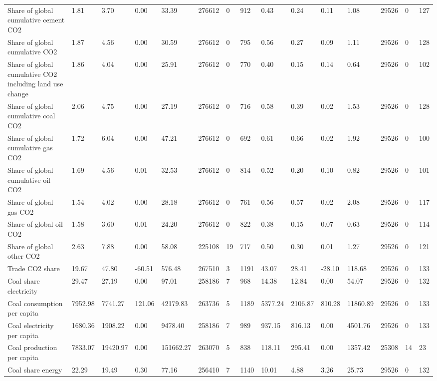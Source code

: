 \begin{longtable}{lllllllllllllll}
\addlinespace
Share of global cumulative cement CO2 & 1.81 & 3.70 & 0.00 & 33.39 & 276612 & 0 & 912 & 0.43 & 0.24 & 0.11 & 1.08 & 29526 & 0 & 127\\
Share of global cumulative CO2 & 1.87 & 4.56 & 0.00 & 30.59 & 276612 & 0 & 795 & 0.56 & 0.27 & 0.09 & 1.11 & 29526 & 0 & 128\\
Share of global cumulative CO2 including land use change & 1.86 & 4.04 & 0.00 & 25.91 & 276612 & 0 & 770 & 0.40 & 0.15 & 0.14 & 0.64 & 29526 & 0 & 102\\
Share of global cumulative coal CO2 & 2.06 & 4.75 & 0.00 & 27.19 & 276612 & 0 & 716 & 0.58 & 0.39 & 0.02 & 1.53 & 29526 & 0 & 128\\
Share of global cumulative gas CO2 & 1.72 & 6.04 & 0.00 & 47.21 & 276612 & 0 & 692 & 0.61 & 0.66 & 0.02 & 1.92 & 29526 & 0 & 100\\
\addlinespace
Share of global cumulative oil CO2 & 1.69 & 4.56 & 0.01 & 32.53 & 276612 & 0 & 814 & 0.52 & 0.20 & 0.10 & 0.82 & 29526 & 0 & 101\\
Share of global gas CO2 & 1.54 & 4.02 & 0.00 & 28.18 & 276612 & 0 & 761 & 0.56 & 0.57 & 0.02 & 2.08 & 29526 & 0 & 117\\
Share of global oil CO2 & 1.58 & 3.60 & 0.01 & 24.20 & 276612 & 0 & 822 & 0.38 & 0.15 & 0.07 & 0.63 & 29526 & 0 & 114\\
Share of global other CO2 & 2.63 & 7.88 & 0.00 & 58.08 & 225108 & 19 & 717 & 0.50 & 0.30 & 0.01 & 1.27 & 29526 & 0 & 121\\
Trade CO2 share & 19.67 & 47.80 & -60.51 & 576.48 & 267510 & 3 & 1191 & 43.07 & 28.41 & -28.10 & 118.68 & 29526 & 0 & 133\\
\addlinespace
Coal share electricity & 29.47 & 27.19 & 0.00 & 97.01 & 258186 & 7 & 968 & 14.38 & 12.84 & 0.00 & 54.07 & 29526 & 0 & 132\\
Coal consumption per capita & 7952.98 & 7741.27 & 121.06 & 42179.83 & 263736 & 5 & 1189 & 5377.24 & 2106.87 & 810.28 & 11860.89 & 29526 & 0 & 133\\
Coal electricity per capita & 1680.36 & 1908.22 & 0.00 & 9478.40 & 258186 & 7 & 989 & 937.15 & 816.13 & 0.00 & 4501.76 & 29526 & 0 & 133\\
Coal production per capita & 7833.07 & 19420.97 & 0.00 & 151662.27 & 263070 & 5 & 838 & 118.11 & 295.41 & 0.00 & 1357.42 & 25308 & 14 & 23\\
Coal share energy & 22.29 & 19.49 & 0.30 & 77.16 & 256410 & 7 & 1140 & 10.01 & 4.88 & 3.26 & 25.73 & 29526 & 0 & 132\\

\end{longtable}
